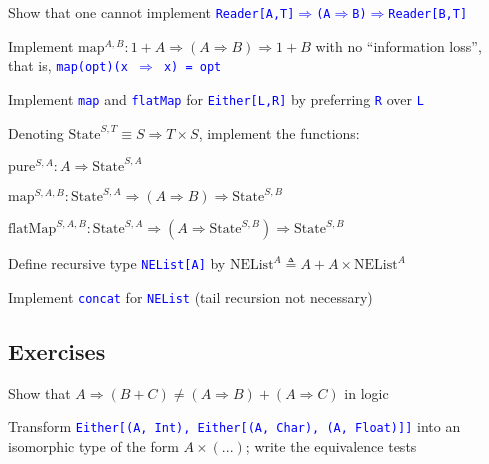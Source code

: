 Show that one cannot implement \texttt{\textcolor{blue}{\footnotesize{}Reader{[}A,T{]}$\Rightarrow$(A$\Rightarrow$B)$\Rightarrow$Reader{[}B,T{]}}}{\footnotesize\par}

Implement {\footnotesize{}$\text{map}^{A,B}:1+A\Rightarrow(A\Rightarrow B)\Rightarrow1+B$
}with no ``information loss'', that is, \texttt{\textcolor{blue}{\footnotesize{}map(opt)(x
$\Rightarrow$ x) = opt}}{\footnotesize\par}

Implement \texttt{\textcolor{blue}{\footnotesize{}map}} and \texttt{\textcolor{blue}{\footnotesize{}flatMap}}
for \texttt{\textcolor{blue}{\footnotesize{}Either{[}L,R{]}}} by preferring
\texttt{\textcolor{blue}{\footnotesize{}R}} over \texttt{\textcolor{blue}{\footnotesize{}L}}{\footnotesize\par}

Denoting {\footnotesize{}$\text{State}^{S,T}\equiv S\Rightarrow T\times S$},
implement the functions:

$\text{pure}^{S,A}:A\Rightarrow\text{State}^{S,A}$

$\text{map}^{S,A,B}:\text{State}^{S,A}\Rightarrow(A\Rightarrow B)\Rightarrow\text{State}^{S,B}$

{\footnotesize{}$\text{flatMap}^{S,A,B}:\text{State}^{S,A}\Rightarrow(A\Rightarrow\text{State}^{S,B})\Rightarrow\text{State}^{S,B}$}{\footnotesize\par}

Define recursive type \texttt{\textcolor{blue}{\footnotesize{}NEList{[}A{]}}}
by{\footnotesize{} $\text{NEList}^{A}\triangleq A+A\times\text{NEList}^{A}$}{\footnotesize\par}

Implement \texttt{\textcolor{blue}{\footnotesize{}concat}} for \texttt{\textcolor{blue}{\footnotesize{}NEList}}
(tail recursion not necessary)

\subsection{Exercises }

Show that {\footnotesize{}$A\Rightarrow(B+C)\neq(A\Rightarrow B)+(A\Rightarrow C)$
}in logic

Transform \texttt{\textcolor{blue}{\footnotesize{}Either{[}(A, Int),
Either{[}(A, Char), (A, Float){]}{]}}} into an isomorphic type of
the form {\footnotesize{}$A\times(...)$};{\footnotesize{} }write{\footnotesize{}
}the{\footnotesize{} }equivalence tests

